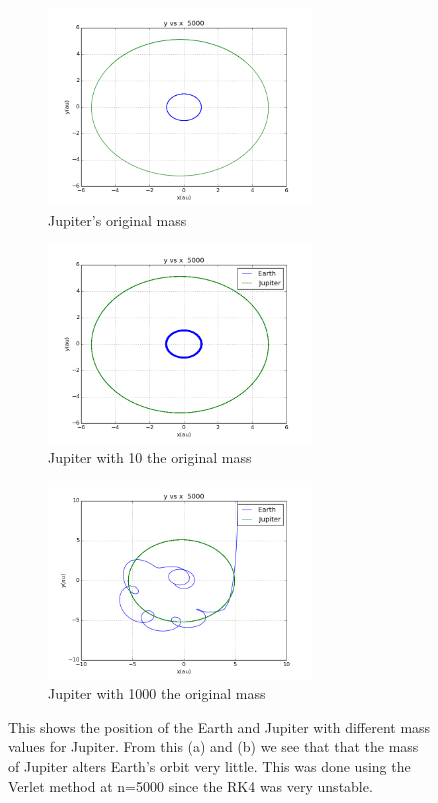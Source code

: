 \documentclass[11pt,a4wide]{article}
\begin{document}
\begin{figure}[H]
\begin{subfigure}[b]{0.5\linewidth}
    \centering
    \includegraphics[width=70mm]{EJ.png}
    \caption{Jupiter's original mass} 
    \label{fig7:a} 
    \vspace{4ex}
\end{subfigure}%
\begin{subfigure}[b]{0.5\linewidth}
    \centering
    \includegraphics[width=70mm]{EJ_10V.png}
    \caption{Jupiter with 10 the original mass} 
    \label{fig7:b} 
    \vspace{4ex}
\end{subfigure}
\begin{subfigure}[b]{0.5\linewidth}
    \centering
    \includegraphics[width=70mm]{EJ_E3V.png}
    \caption{Jupiter with 1000 the original mass} 
    \label{fig7:c} 
    \vspace{4ex}
\end{subfigure}%
\caption{This shows the position of the Earth and Jupiter with different mass values for Jupiter. From this (a) and (b) we see that that the mass of Jupiter alters Earth's orbit very little. This was done using the Verlet method at n=5000 since the RK4 was very unstable.}
\end{figure}
\end{document}

